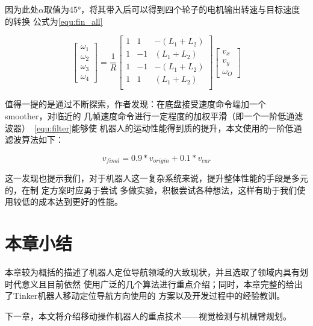 因为此处$\alpha$取值为\ang{45}，将其带入后可以得到四个轮子的电机输出转速与目标速度的转换
公式为\ref{equ:fin_all}

\begin{equation}
  \label{equ:fin_all}
  \begin{bmatrix}
    \omega_1 \\
    \omega_2 \\
    \omega_3 \\
    \omega_4
  \end{bmatrix}
    = \frac{1}{R}
  \begin{bmatrix}
    1 &  1 & -(L_1 + L_2) \\
    1 & -1 &  (L_1 + L_2) \\
    1 & -1 & -(L_1 + L_2) \\
    1 &  1 &  (L_1 + L_2) \\
  \end{bmatrix}
  \begin{bmatrix}
    v_x \\
    v_y \\
    \omega_O
  \end{bmatrix}
\end{equation}

值得一提的是通过不断探索，作者发现：在底盘接受速度命令端加一个smoother，对临近的
几帧速度命令进行一定程度的加权平滑（即一个一阶低通滤波器）~\ref{equ:filter}能够使
机器人的运动性能得到质的提升，本文使用的一阶低通滤波算法如下：

\begin{equation}
  \label{equ:filter}
  v_{final} = 0.9 * v_{origin} + 0.1 * v_{cur}
\end{equation}

这一发现也提示我们，对于机器人这一复杂系统来说，提升整体性能的手段是多元的，在制
定方案时应勇于尝试
多做实验，积极尝试各种想法，这样有助于我们使用较低的成本达到更好的性能。

\section{本章小结}

本章较为概括的描述了机器人定位导航领域的大致现状，并且选取了领域内具有划时代意义且目前依然
使用广泛的几个算法进行重点介绍；同时，本章完整的给出了Tinker机器人移动定位导航方向使用的
方案以及开发过程中的经验教训。

下一章，本文将介绍移动操作机器人的重点技术——视觉检测与机械臂规划。




